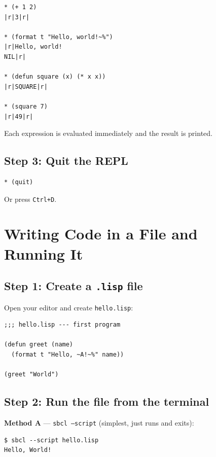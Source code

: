 \documentclass[a4paper,11pt]{article}
\newcommand{\key}[1]{\texttt{#1}}
\newcommand{\file}[1]{\texttt{#1}}
\begin{document}
\begin{lstlisting}[style=repl]
* (+ 1 2)
|r|3|r|

* (format t "Hello, world!~%")
|r|Hello, world!
NIL|r|

* (defun square (x) (* x x))
|r|SQUARE|r|

* (square 7)
|r|49|r|
\end{lstlisting}

Each expression is evaluated immediately and the result is printed.

\subsection{Step 3: Quit the REPL}

\begin{lstlisting}[style=repl]
* (quit)
\end{lstlisting}

Or press \key{Ctrl+D}.

\section{Writing Code in a File and Running It}

\subsection{Step 1: Create a \file{.lisp} file}

Open your editor and create \file{hello.lisp}:

\begin{lstlisting}
;;; hello.lisp --- first program

(defun greet (name)
  (format t "Hello, ~A!~%" name))

(greet "World")
\end{lstlisting}

\subsection{Step 2: Run the file from the terminal}

\textbf{Method A} --- \texttt{sbcl --script} (simplest, just runs and exits):

\begin{lstlisting}[style=shell]
$ sbcl --script hello.lisp
Hello, World!
\end{lstlisting}
\end{document}
